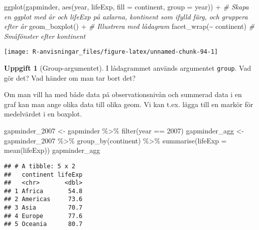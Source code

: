 \documentclass[
]{book}
\newenvironment{Shaded}{\begin{snugshade}}{\end{snugshade}}
\newcommand{\AttributeTok}[1]{\textcolor[rgb]{0.77,0.63,0.00}{#1}}
\newcommand{\CommentTok}[1]{\textcolor[rgb]{0.56,0.35,0.01}{\textit{#1}}}
\newcommand{\DecValTok}[1]{\textcolor[rgb]{0.00,0.00,0.81}{#1}}
\newcommand{\FunctionTok}[1]{\textcolor[rgb]{0.00,0.00,0.00}{#1}}
\newcommand{\NormalTok}[1]{#1}
\newcommand{\OtherTok}[1]{\textcolor[rgb]{0.56,0.35,0.01}{#1}}
\newcommand{\SpecialCharTok}[1]{\textcolor[rgb]{0.00,0.00,0.00}{#1}}
\theoremstyle{definition}
\theoremstyle{definition}
\theoremstyle{definition}
\newtheorem{exercise}{Uppgift}[chapter]
\theoremstyle{definition}
\theoremstyle{remark}
\begin{document}
\begin{Shaded}
\begin{Highlighting}[]
\FunctionTok{ggplot}\NormalTok{(gapminder, }\FunctionTok{aes}\NormalTok{(year, lifeExp, }\AttributeTok{fill =}\NormalTok{ continent, }\AttributeTok{group =}\NormalTok{ year)) }\SpecialCharTok{+}        \CommentTok{\# Skapa en ggplot med år och lifeExp på axlarna, kontinent som ifylld färg, och gruppera efter år}
  \FunctionTok{geom\_boxplot}\NormalTok{() }\SpecialCharTok{+}                                                             \CommentTok{\# Illustrera med lådagram}
  \FunctionTok{facet\_wrap}\NormalTok{(}\SpecialCharTok{\textasciitilde{}}\NormalTok{ continent)                                                      }\CommentTok{\# Småfönster efter kontinent}
\end{Highlighting}
\end{Shaded}

\begin{center}\texttt{[image: R-anvisningar\_files/figure-latex/unnamed-chunk-94-1]} \end{center}

\begin{exercise}[Group-argumentet]
I lådagrammet används argumentet \texttt{group}. Vad gör det? Vad händer om man tar bort det?
\end{exercise}

Om man vill ha med både data på observationsnivån och summerad data i en graf kan man ange olika data till olika geom. Vi kan t.ex. lägga till en markör för medelvärdet i en boxplot.

\begin{Shaded}
\begin{Highlighting}[]
\NormalTok{gapminder\_2007 }\OtherTok{\textless{}{-}}\NormalTok{ gapminder }\SpecialCharTok{\%\textgreater{}\%} \FunctionTok{filter}\NormalTok{(year }\SpecialCharTok{==} \DecValTok{2007}\NormalTok{)}
\NormalTok{gapminder\_agg }\OtherTok{\textless{}{-}}\NormalTok{ gapminder\_2007 }\SpecialCharTok{\%\textgreater{}\%} 
  \FunctionTok{group\_by}\NormalTok{(continent) }\SpecialCharTok{\%\textgreater{}\%} 
  \FunctionTok{summarise}\NormalTok{(}\AttributeTok{lifeExp =} \FunctionTok{mean}\NormalTok{(lifeExp))}
\NormalTok{gapminder\_agg}
\end{Highlighting}
\end{Shaded}

\begin{verbatim}
## # A tibble: 5 x 2
##   continent lifeExp
##   <chr>       <dbl>
## 1 Africa       54.8
## 2 Americas     73.6
## 3 Asia         70.7
## 4 Europe       77.6
## 5 Oceania      80.7
\end{verbatim}
\end{document}
